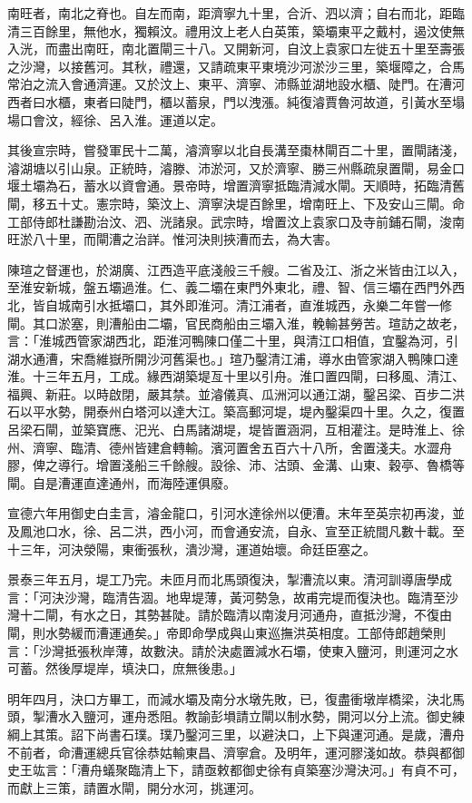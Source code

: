 南旺者，南北之脊也。自左而南，距濟寧九十里，合沂、泗以濟；自右而北，距臨清三百餘里，無他水，獨賴汶。禮用汶上老人白英策，築壩東平之戴村，遏汶使無入洸，而盡出南旺，南北置閘三十八。又開新河，自汶上袁家口左徙五十里至壽張之沙灣，以接舊河。其秋，禮還，又請疏東平東境沙河淤沙三里，築堰障之，合馬常泊之流入會通濟運。又於汶上、東平、濟寧、沛縣並湖地設水櫃、陡門。在漕河西者曰水櫃，東者曰陡門，櫃以蓄泉，門以洩漲。純復濬賈魯河故道，引黃水至塌場口會汶，經徐、呂入淮。運道以定。

其後宣宗時，嘗發軍民十二萬，濬濟寧以北自長溝至棗林閘百二十里，置閘諸淺，濬湖塘以引山泉。正統時，濬滕、沛淤河，又於濟寧、勝三州縣疏泉置閘，易金口堰土壩為石，蓄水以資會通。景帝時，增置濟寧抵臨清減水閘。天順時，拓臨清舊閘，移五十丈。憲宗時，築汶上、濟寧決堤百餘里，增南旺上、下及安山三閘。命工部侍郎杜謙勘治汶、泗、洸諸泉。武宗時，增置汶上袁家口及寺前鋪石閘，浚南旺淤八十里，而閘漕之治詳。惟河決則挾漕而去，為大害。

陳瑄之督運也，於湖廣、江西造平底淺般三千艘。二省及江、浙之米皆由江以入，至淮安新城，盤五壩過淮。仁、義二壩在東門外東北，禮、智、信三壩在西門外西北，皆自城南引水抵壩口，其外即淮河。清江浦者，直淮城西，永樂二年嘗一修閘。其口淤塞，則漕船由二壩，官民商船由三壩入淮，輓輸甚勞苦。瑄訪之故老，言：「淮城西管家湖西北，距淮河鴨陳口僅二十里，與清江口相值，宜鑿為河，引湖水通漕，宋喬維嶽所開沙河舊渠也。」瑄乃鑿清江浦，導水由管家湖入鴨陳口達淮。十三年五月，工成。緣西湖築堤亙十里以引舟。淮口置四閘，曰移風、清江、福興、新莊。以時啟閉，嚴其禁。並濬儀真、瓜洲河以通江湖，鑿呂梁、百步二洪石以平水勢，開泰州白塔河以達大江。築高郵河堤，堤內鑿渠四十里。久之，復置呂梁石閘，並築寶應、汜光、白馬諸湖堤，堤皆置涵洞，互相灌注。是時淮上、徐州、濟寧、臨清、德州皆建倉轉輸。濱河置舍五百六十八所，舍置淺夫。水澀舟膠，俾之導行。增置淺船三千餘艘。設徐、沛、沽頭、金溝、山東、穀亭、魯橋等閘。自是漕運直達通州，而海陸運俱廢。

宣德六年用御史白圭言，濬金龍口，引河水達徐州以便漕。末年至英宗初再浚，並及鳳池口水，徐、呂二洪，西小河，而會通安流，自永、宣至正統間凡數十載。至十三年，河決滎陽，東衝張秋，潰沙灣，運道始壞。命廷臣塞之。

景泰三年五月，堤工乃完。未匝月而北馬頭復決，掣漕流以東。清河訓導唐學成言：「河決沙灣，臨清告涸。地卑堤薄，黃河勢急，故甫完堤而復決也。臨清至沙灣十二閘，有水之日，其勢甚陡。請於臨清以南浚月河通舟，直抵沙灣，不復由閘，則水勢緩而漕運通矣。」帝即命學成與山東巡撫洪英相度。工部侍郎趙榮則言：「沙灣抵張秋岸薄，故數決。請於決處置減水石壩，使東入鹽河，則運河之水可蓄。然後厚堤岸，填決口，庶無後患。」

明年四月，決口方畢工，而減水壩及南分水墩先敗，已，復盡衝墩岸橋梁，決北馬頭，掣漕水入鹽河，運舟悉阻。教諭彭塤請立閘以制水勢，開河以分上流。御史練綱上其策。詔下尚書石璞。璞乃鑿河三里，以避決口，上下與運河通。是歲，漕舟不前者，命漕運總兵官徐恭姑輸東昌、濟寧倉。及明年，運河膠淺如故。恭與都御史王竑言：「漕舟蟻聚臨清上下，請亟敕都御史徐有貞築塞沙灣決河。」有貞不可，而獻上三策，請置水閘，開分水河，挑運河。

